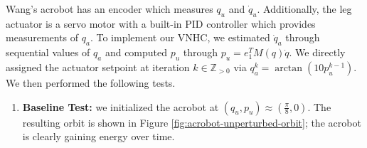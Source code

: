 \documentclass[journal,twoside,web]{ieeecolor}
\begin{document}
Wang's acrobot has an encoder which measures \(q_u\) and
\(\dot{q}_u\).
Additionally, the leg actuator is a servo motor with a built-in PID controller
which provides measurements of \(q_a\).
To implement our VNHC, we estimated \(\dot{q}_a\) through sequential values of
\(q_a\) and computed \(p_u\) through \(p_u = e_1^T M(q) \dot{q}\).
We directly assigned the actuator setpoint at iteration \(k \in \mathbb{Z}_{> 0}\)
via \(q_a^{k} = \arctan(10 p_u^{k-1})\).
We then performed the following tests.

\begin{enumerate}
    \item \textbf{Baseline Test:} 
    we initialized the acrobot at 
    \((q_u,p_u) \approx \left(\frac{\pi}{8},0\right)\). 
    The resulting orbit is shown in Figure \ref{fig:acrobot-unperturbed-orbit};
    the acrobot is clearly gaining energy over time.


\end{enumerate}
\end{document}
